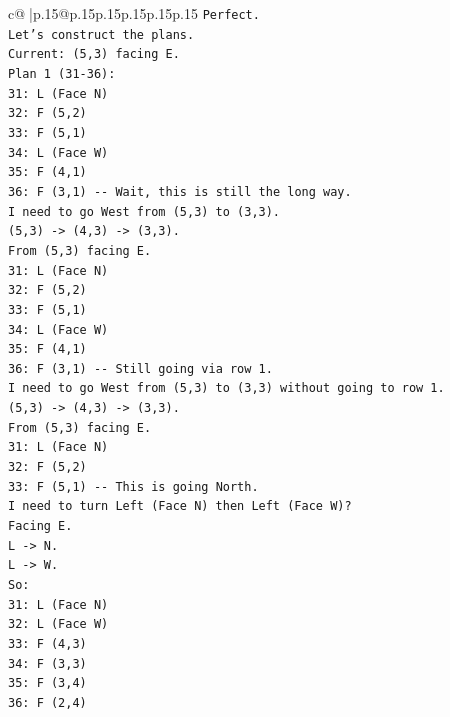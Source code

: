 \documentclass{article}
\begin{document}
{\begin{supertabular}{c@{$\;$}|p{.15\linewidth}@{}p{.15\linewidth}p{.15\linewidth}p{.15\linewidth}p{.15\linewidth}p{.15\linewidth}}
{{{\texttt{Perfect.} \\
\texttt{Let's construct the plans.} \\
\texttt{Current: (5,3) facing E.} \\
\texttt{Plan 1 (31{-}36):} \\
\texttt{31: L (Face N)} \\
\texttt{32: F (5,2)} \\
\texttt{33: F (5,1)} \\
\texttt{34: L (Face W)} \\
\texttt{35: F (4,1)} \\
\texttt{36: F (3,1) {-}{-} Wait, this is still the long way.} \\
\texttt{I need to go West from (5,3) to (3,3).} \\
\texttt{(5,3) {-}> (4,3) {-}> (3,3).} \\
\texttt{From (5,3) facing E.} \\
\texttt{31: L (Face N)} \\
\texttt{32: F (5,2)} \\
\texttt{33: F (5,1)} \\
\texttt{34: L (Face W)} \\
\texttt{35: F (4,1)} \\
\texttt{36: F (3,1) {-}{-} Still going via row 1.} \\
\texttt{I need to go West from (5,3) to (3,3) without going to row 1.} \\
\texttt{(5,3) {-}> (4,3) {-}> (3,3).} \\
\texttt{From (5,3) facing E.} \\
\texttt{31: L (Face N)} \\
\texttt{32: F (5,2)} \\
\texttt{33: F (5,1) {-}{-} This is going North.} \\
\texttt{I need to turn Left (Face N) then Left (Face W)?} \\
\texttt{Facing E.} \\
\texttt{L {-}> N.} \\
\texttt{L {-}> W.} \\
\texttt{So:} \\
\texttt{31: L (Face N)} \\
\texttt{32: L (Face W)} \\
\texttt{33: F (4,3)} \\
\texttt{34: F (3,3)} \\
\texttt{35: F (3,4)} \\
\texttt{36: F (2,4)} \\
}}}
\end{supertabular}}
\end{document}
